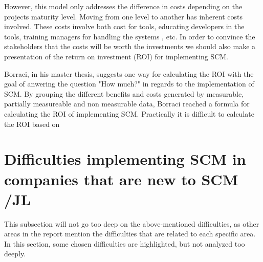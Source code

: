 \documentclass[10pt]{article}
\begin{document}
\noindent However, this model only addresses the difference in costs depending on the projects maturity level. Moving from one level to another has inherent costs involved. These costs involve both cost for tools, educating developers in the tools, training managers for handling the systems , etc. In order to convince the stakeholders that the costs will be worth the investments we should also make a presentation of the return on investment (ROI) for implementing SCM.

\noindent Borraci\cite{Borraci}, in his master thesis, suggests one way for calculating the ROI with the goal of anwering the question "How much?" in regards to the implementation of SCM. By grouping the different benefits and costs generated by measurable, partially measureable and non measurable data, Borraci reached a formula for calculating the ROI of implementing SCM. Practically it is difficult to calculate the ROI based on 

\section{Difficulties implementing SCM in companies that are new to SCM /JL}
This subsection will not go too deep on the above-mentioned difficulties, as other areas in the report mention the difficulties that are related to each specific area. In this section, some chosen difficulties are highlighted, but not analyzed too deeply.
\end{document}
